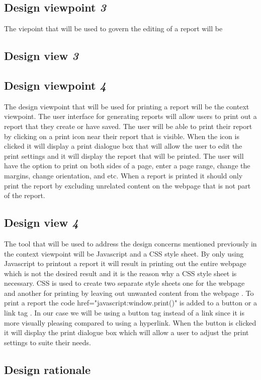 \documentclass[letterpaper,10pt,serif, draftclsnofoot,onecolumn, compsoc, titlepage]{IEEEtran}
\begin{document}
\subsection{Design viewpoint \emph{3}}
The viepoint that will be used to govern the editing of a report will be 
\subsection{Design view \emph{3}}


\subsection {Design viewpoint \emph{4}}
The design viewpoint that will be used for printing a report will be  the context viewpoint. 
The user interface for generating reports will allow users to print out a report that they create or have saved.
The user will be able to print their report by clicking on a print icon near their report that is visible.
When the icon is clicked it will display a print dialogue box that will allow the user to edit the print settings and it will display the report that will be printed.
The user will have the option to print on both sides of a page, enter a page range, change the margins, change orientation, and etc. 
When a report is printed it should only print the report by excluding unrelated content on the webpage that is not part of the report. 
\subsection{Design view \emph{4}}
The tool that will be used to address the design concerns mentioned previously in the context viewpoint will be Javascript and a CSS style sheet. 
By only using Javascript to printout a report it will result in printing out the entire webpage which is not the desired result and it is the reason why a CSS style sheet is necessary.
CSS is used to create two separate style sheets one for the webpage and another for printing by leaving out unwanted content from the webpage \cite{Javascript}. 
To print a report the code href="javascript:window.print()" is added to a button or a link tag \cite{Javascript}. 
In our case we will be using a button tag instead of a link since it is more visually pleasing compared to using a hyperlink. 
When the button is clicked it will display the print dialogue box which will allow a user to adjust the print settings to suite their needs. 

\subsection{Design rationale}
\end{document}
